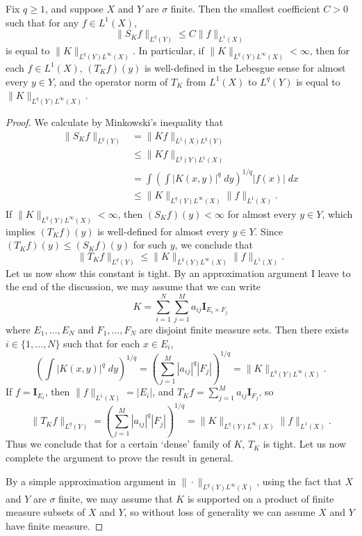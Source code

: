 \begin{theorem}
  Fix $q \geq 1$, and suppose $X$ and $Y$ are $\sigma$ finite. Then the smallest coefficient $C > 0$ such that for any $f \in L^1(X)$,
  \[ \| S_K f \|_{L^q(Y)} \leq C \| f \|_{L^1(X)} \]
  is equal to $\| K \|_{L^q(Y) L^\infty(X)}$. In particular, if $\| K \|_{L^q(Y) L^\infty(X)} < \infty$, then for each $f \in L^1(X)$, $(T_K f)(y)$ is well-defined in the Lebesgue sense for almost every $y \in Y$, and the operator norm of $T_K$ from $L^1(X)$ to $L^q(Y)$ is equal to $\| K \|_{L^q(Y) L^\infty(X)}$.
\end{theorem}
\begin{proof}
  We calculate by Minkowski's inequality that
  \begin{align*}
    \| S_K f \|_{L^q(Y)} &= \| K f \|_{L^1(X) L^q(Y)}\\
    &\leq \| Kf \|_{L^q(Y) L^1(X)}\\
    &= \int \left( \int |K(x,y)|^q\; dy \right)^{1/q} |f(x)|\; dx\\
    &\leq \| K \|_{L^q(Y)L^\infty(X)} \| f \|_{L^1(X)}.
  \end{align*}
  If $\| K \|_{L^q(Y) L^\infty(X)} < \infty$, then $(S_K f)(y) < \infty$ for almost every $y \in Y$, which implies $(T_K f)(y)$ is well-defined for almost every $y \in Y$. Since $(T_K f)(y) \leq (S_K f)(y)$ for such $y$, we conclude that
  \[ \| T_K f \|_{L^q(Y)} \leq \| K \|_{L^q(Y) L^\infty(X)} \| f \|_{L^1(X)}. \]
  Let us now show this constant is tight. By an approximation argument I leave to the end of the discussion, we may assume that we can write
  \[ K = \sum_{i = 1}^N \sum_{j = 1}^M a_{ij} \mathbf{I}_{E_i \times F_j} \]
  where $E_1,\dots,E_N$ and $F_1,\dots,F_N$ are disjoint finite measure sets. Then there exists $i \in \{ 1, \dots, N \}$ such that for each $x \in E_i$,
  \[ \left( \int |K(x,y)|^q\; dy \right)^{1/q} = \left( \sum_{j = 1}^M |a_{ij}|^q |F_j| \right)^{1/q} = \| K \|_{L^q(Y) L^\infty(X)}. \]
  If $f = \mathbf{I}_{E_i}$, then $\| f \|_{L^1(X)} = |E_i|$, and $T_K f = \sum_{j = 1}^M a_{ij} \mathbf{I}_{F_j}$, so
  \[ \| T_K f \|_{L^q(Y)} = \left( \sum_{j = 1}^M |a_{ij}|^q |F_j| \right)^{1/q} = \| K \|_{L^q(Y)L^\infty(X)} \| f \|_{L^1(X)}. \]
  Thus we conclude that for a certain `dense' family of $K$, $T_K$ is tight. Let us now complete the argument to prove the result in general.


  By a simple approximation argument in $\| \cdot \|_{L^q(Y) L^\infty(X)}$, using the fact that $X$ and $Y$ are $\sigma$ finite, we may assume that $K$ is supported on a product of finite measure subsets of $X$ and $Y$, so without loss of generality we can assume $X$ and $Y$ have finite measure.
\end{proof}

